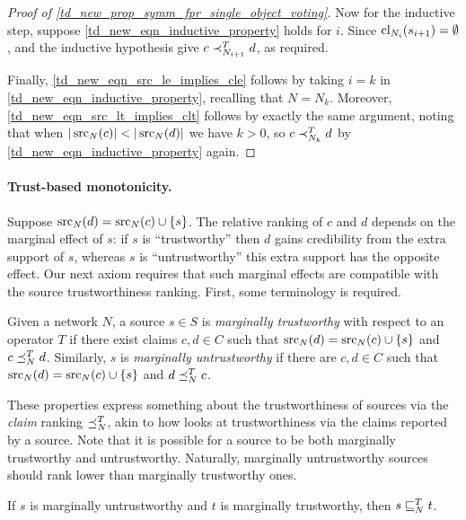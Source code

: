 \begin{proof}[Proof of \cref{td_new_prop_symm_fpr_single_object_voting}]
    Now for the inductive step, suppose \cref{td_new_eqn_inductive_property}
    holds for $i$. Since $\operatorname{cl}_{N_i}(s_{i + 1}) = \emptyset$,
    \freshposresp{} and the inductive hypothesis give $c \prec_{N_{i + 1}}^T d$,
    as required.

    Finally, \cref{td_new_eqn_src_le_implies_cle} follows by taking $i = k$ in
    \cref{td_new_eqn_inductive_property}, recalling that $N = N_k$. Moreover,
    \cref{td_new_eqn_src_lt_implies_clt} follows by exactly the same argument,
    noting that when $|\operatorname{src}_N(c)| < |\operatorname{src}_N(d)|$ we have $k > 0$, so $c
    \prec_{N_k}^T d$ by \cref{td_new_eqn_inductive_property} again.
\end{proof}

\paragraph{Trust-based monotonicity.}

Suppose $\operatorname{src}_N(d) = \operatorname{src}_N(c) \cup \{s\}$. The relative ranking of $c$ and
$d$ depends on the marginal effect of $s$: if $s$ is ``trustworthy'' then $d$
gains credibility from the extra support of $s$, whereas $s$ is
``untrustworthy'' this extra support has the opposite effect. Our next axiom
requires that such marginal effects are compatible with the source
trustworthiness ranking. First, some terminology is required.

\begin{definition}
    Given a network $N$, a source $s \in S$ is \emph{marginally trustworthy}
    with respect to an operator $T$ if there exist claims $c, d \in C$ such
    that $\operatorname{src}_N(d) = \operatorname{src}_N(c) \cup \{s\}$ and $c \preceq_N^T d$.
    Similarly, $s$ is \emph{marginally untrustworthy} if there are $c, d  \in
    C$ such that $\operatorname{src}_N(d) = \operatorname{src}_N(c) \cup \{s\}$ and $d \preceq_N^T c$.
\end{definition}

These properties express something about the trustworthiness of sources
via the \emph{claim} ranking $\preceq_N^T$, akin to how \sourcecoherence{} looks
at trustworthiness via the claims reported by a source. Note that it is
possible for a source to be both marginally trustworthy and untrustworthy.
Naturally, marginally untrustworthy sources should rank lower than marginally
trustworthy ones.

\begin{axiom}[\marginaltrustworthiness{}]
    If $s$ is marginally untrustworthy and $t$ is marginally trustworthy, then
    $s \sqsubseteq_N^T t$.
\end{axiom}

